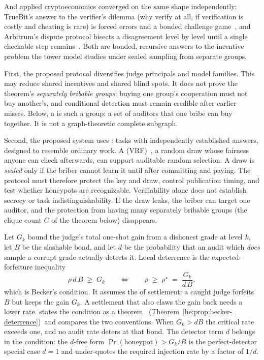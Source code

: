\documentclass[11pt,a4paper]{article}
\theoremstyle{definition}
\newcounter{protocol}[section]
\begin{document}
And applied cryptoeconomics converged
on the same shape independently: TrueBit's answer to the verifier's dilemma
(why verify at all, if verification is costly and cheating is rare) is forced
errors and a bonded challenge game~, and Arbitrum's dispute
protocol bisects a disagreement level by level until a single checkable step
remains~. Both are bonded, recursive answers to
the incentive problem the tower model studies under sealed sampling from
separate groups.

First, the proposed protocol diversifies judge principals and model families. This may reduce shared incentives and shared blind spots. It does not prove the theorem's \emph{separately bribable groups}: buying one group's cooperation must not buy another's, and conditional detection must remain credible after earlier misses. Below, a  is such a group: a set of auditors that one bribe can buy together. It is not a graph-theoretic complete subgraph.

Second, the proposed system uses : tasks with independently established answers, designed to resemble ordinary work. A  (VRF)~, a random draw whose fairness anyone can check afterwards, can support auditable random selection. A draw is \emph{sealed} only if the briber cannot learn it until after committing and paying. The protocol must therefore protect the key and draw, control publication timing, and test whether honeypots are recognizable. Verifiability alone does not establish secrecy or task indistinguishability. If the draw leaks, the briber can target one auditor, and the protection from having many separately bribable groups (the clique count $C$ of the theorem below) disappears.



Let $G_k$ bound the judge's total one-shot gain from a dishonest grade at level
$k$, let $B$ be the slashable bond, and let $d$ be the probability that an audit
which \emph{does} sample a corrupt grade actually detects it. Local deterrence is
the expected-forfeiture inequality
\[
  \rho\, d\, B \;\ge\; G_k
  \qquad\Longleftrightarrow\qquad
  \rho \;\ge\; \rho^\star \;=\; \frac{G_k}{d\,B},
\]
which is Becker's condition. It assumes the  of
settlement: a caught judge forfeits $B$ but keeps the gain $G_k$. A settlement
that also claws the gain back needs a lower rate.  states the condition as a theorem%
\ifpdbook\ (Theorem~\ref{he:prop:becker-deterrence})\fi\ and compares the two
conventions. When $G_k>dB$ the critical rate exceeds one, and no audit rate
deters at that bond. The detector term $d$ belongs in the condition: the
$d$-free form $\Pr(\text{honeypot}) > G_k/B$ is the perfect-detector special case
$d=1$ and under-quotes the required injection rate by a factor of $1/d$.
\end{document}
